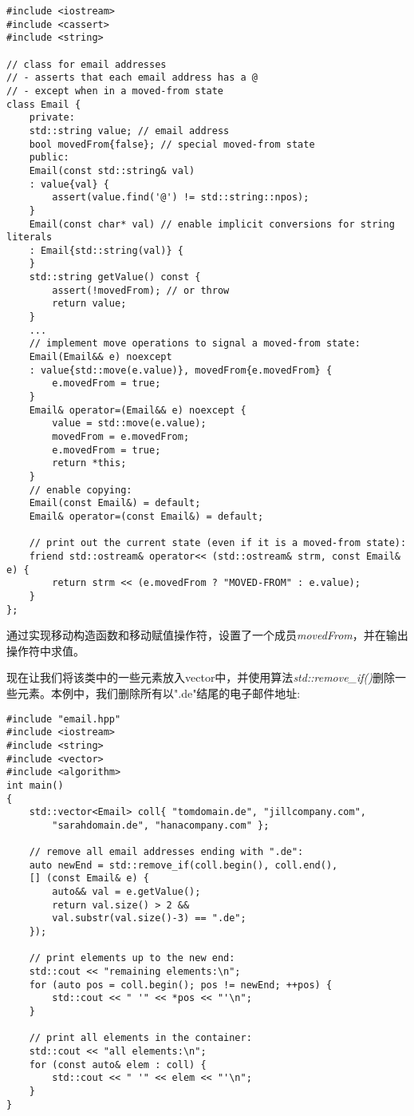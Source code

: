 \begin{lstlisting}[caption={}]
#include <iostream>
#include <cassert>
#include <string>

// class for email addresses
// - asserts that each email address has a @
// - except when in a moved-from state
class Email {
	private:
	std::string value; // email address
	bool movedFrom{false}; // special moved-from state
	public:
	Email(const std::string& val)
	: value{val} {
		assert(value.find('@') != std::string::npos);
	}
	Email(const char* val) // enable implicit conversions for string literals
	: Email{std::string(val)} {
	}
	std::string getValue() const {
		assert(!movedFrom); // or throw
		return value;
	}
	...
	// implement move operations to signal a moved-from state:
	Email(Email&& e) noexcept
	: value{std::move(e.value)}, movedFrom{e.movedFrom} {
		e.movedFrom = true;
	}
	Email& operator=(Email&& e) noexcept {
		value = std::move(e.value);
		movedFrom = e.movedFrom;
		e.movedFrom = true;
		return *this;
	}
	// enable copying:
	Email(const Email&) = default;
	Email& operator=(const Email&) = default;
	
	// print out the current state (even if it is a moved-from state):
	friend std::ostream& operator<< (std::ostream& strm, const Email& e) {
		return strm << (e.movedFrom ? "MOVED-FROM" : e.value);
	}
};
\end{lstlisting}

通过实现移动构造函数和移动赋值操作符，设置了一个成员\textit{movedFrom}，并在输出操作符中求值。\par

现在让我们将该类中的一些元素放入vector中，并使用算法\textit{std::remove\_if()}删除一些元素。本例中，我们删除所有以".de"结尾的电子邮件地址:\par

{\color{red}{lib/removeif.cpp}}\par

\begin{lstlisting}[caption={}]
#include "email.hpp"
#include <iostream>
#include <string>
#include <vector>
#include <algorithm>
int main()
{
	std::vector<Email> coll{ "tomdomain.de", "jillcompany.com",
		"sarahdomain.de", "hanacompany.com" };
	
	// remove all email addresses ending with ".de":
	auto newEnd = std::remove_if(coll.begin(), coll.end(),
	[] (const Email& e) {
		auto&& val = e.getValue();
		return val.size() > 2 &&
		val.substr(val.size()-3) == ".de";
	});

	// print elements up to the new end:
	std::cout << "remaining elements:\n";
	for (auto pos = coll.begin(); pos != newEnd; ++pos) {
		std::cout << " '" << *pos << "'\n";
	}

	// print all elements in the container:
	std::cout << "all elements:\n";
	for (const auto& elem : coll) {
		std::cout << " '" << elem << "'\n";
	}
}
\end{lstlisting}

